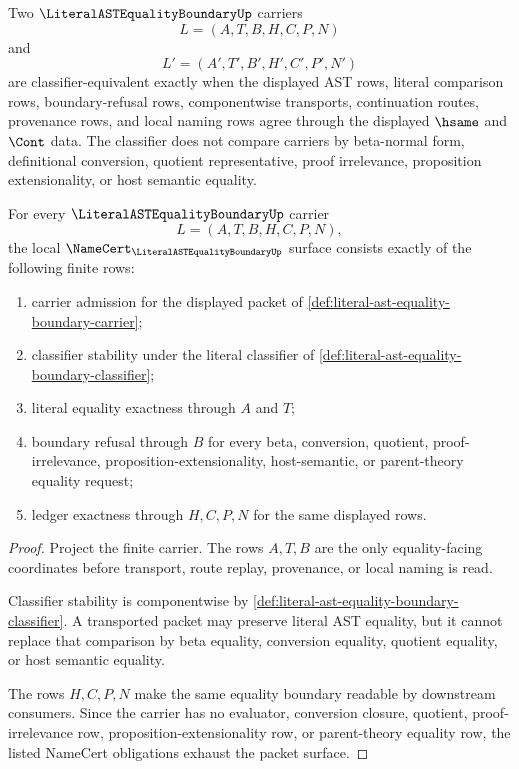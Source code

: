 \begin{definition}
\label{def:literal-ast-equality-boundary-classifier}
Two $\LiteralASTEqualityBoundaryUp$ carriers
$$
L=(A,T,B,H,C,P,N)
$$
and
$$
L'=(A',T',B',H',C',P',N')
$$
are classifier-equivalent exactly when the displayed AST rows, literal comparison rows, boundary-refusal rows, componentwise transports, continuation routes, provenance rows, and local naming rows agree through the displayed $\hsame$ and $\Cont$ data. The classifier does not compare carriers by beta-normal form, definitional conversion, quotient representative, proof irrelevance, proposition extensionality, or host semantic equality.
\end{definition}

\begin{theorem}
\label{thm:literal-ast-equality-boundary-namecert-obligations}
For every $\LiteralASTEqualityBoundaryUp$ carrier
$$
L=(A,T,B,H,C,P,N),
$$
the local $\NameCert_{\LiteralASTEqualityBoundaryUp}$ surface consists exactly of the following finite rows:
\begin{enumerate}
\item carrier admission for the displayed packet of \autoref{def:literal-ast-equality-boundary-carrier};
\item classifier stability under the literal classifier of \autoref{def:literal-ast-equality-boundary-classifier};
\item literal equality exactness through $A$ and $T$;
\item boundary refusal through $B$ for every beta, conversion, quotient, proof-irrelevance, proposition-extensionality, host-semantic, or parent-theory equality request;
\item ledger exactness through $H,C,P,N$ for the same displayed rows.
\end{enumerate}
\end{theorem}
\begin{proof}
Project the finite carrier. The rows $A,T,B$ are the only equality-facing coordinates before transport, route replay, provenance, or local naming is read.

Classifier stability is componentwise by \autoref{def:literal-ast-equality-boundary-classifier}. A transported packet may preserve literal AST equality, but it cannot replace that comparison by beta equality, conversion equality, quotient equality, or host semantic equality.

The rows $H,C,P,N$ make the same equality boundary readable by downstream consumers. Since the carrier has no evaluator, conversion closure, quotient, proof-irrelevance row, proposition-extensionality row, or parent-theory equality row, the listed NameCert obligations exhaust the packet surface.
\end{proof}

